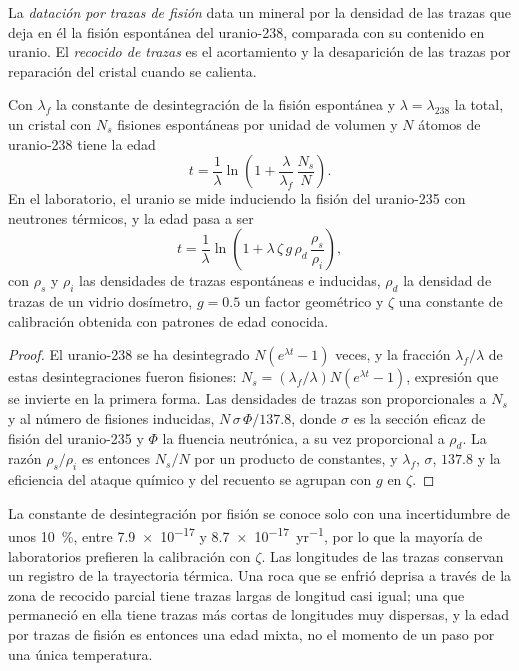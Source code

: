 \begin{definition}\label{def:b3:advanced-geochronology:fission-track}
La \emph{datación por trazas de fisión} data un mineral por
la densidad de las trazas que deja en él la fisión espontánea del
uranio-238, comparada con su contenido en uranio. El \emph{recocido de
trazas} es el acortamiento y la desaparición de las
trazas por reparación del cristal cuando se calienta.
\end{definition}

\begin{theorem}\label{thm:b3:advanced-geochronology:fission-track}
Con $\lambda_f$ la constante de desintegración de la fisión espontánea y $\lambda =
\lambda_{238}$ la total, un cristal con $N_s$ fisiones espontáneas por unidad de
volumen y $N$ átomos de uranio-238 tiene la edad
\[
t = \frac1\lambda\ln\left(1 + \frac{\lambda}{\lambda_f}\,\frac{N_s}{N}\right).
\]
En el laboratorio, el uranio se mide induciendo la fisión del
uranio-235 con neutrones térmicos, y la edad pasa a ser
\[
t = \frac1\lambda\ln\left(1 + \lambda\,\zeta\,g\,\rho_d\,\frac{\rho_s}{\rho_i}\right),
\]
con $\rho_s$ y $\rho_i$ las densidades de trazas espontáneas e inducidas,
$\rho_d$ la densidad de trazas de un vidrio dosímetro, $g = 0.5$ un factor geométrico
y $\zeta$ una constante de calibración obtenida con patrones de edad conocida.
\end{theorem}

\begin{proof}
El uranio-238 se ha desintegrado $N(e^{\lambda t} - 1)$ veces, y la fracción
$\lambda_f/\lambda$ de estas desintegraciones fueron fisiones: $N_s =
(\lambda_f/\lambda)N(e^{\lambda t} - 1)$, expresión que se invierte en la primera forma.
Las densidades de trazas son proporcionales a $N_s$ y al número de fisiones inducidas,
$N\,\sigma\,\Phi/137.8$, donde $\sigma$ es la sección eficaz de fisión del
uranio-235 y $\Phi$ la fluencia neutrónica, a su vez
proporcional a $\rho_d$. La razón $\rho_s/\rho_i$ es entonces $N_s/N$ por
un producto de constantes, y $\lambda_f$, $\sigma$, $137.8$ y la eficiencia
del ataque químico y del recuento se agrupan con $g$ en $\zeta$.
\end{proof}

La constante de desintegración por fisión se conoce solo con una incertidumbre de unos \qty{10}{\percent},
entre \num{7.9e-17} y \qty{8.7e-17}{yr^{-1}}, por lo que la mayoría de
laboratorios prefieren la calibración con $\zeta$. Las longitudes de las trazas conservan
un registro de la trayectoria térmica. Una roca que se enfrió deprisa a través de la
zona de recocido parcial tiene trazas largas de longitud casi igual; una que
permaneció en ella tiene trazas más cortas de longitudes muy dispersas, y la
edad por trazas de fisión es entonces una edad mixta, no el momento de un paso por una
única temperatura.

